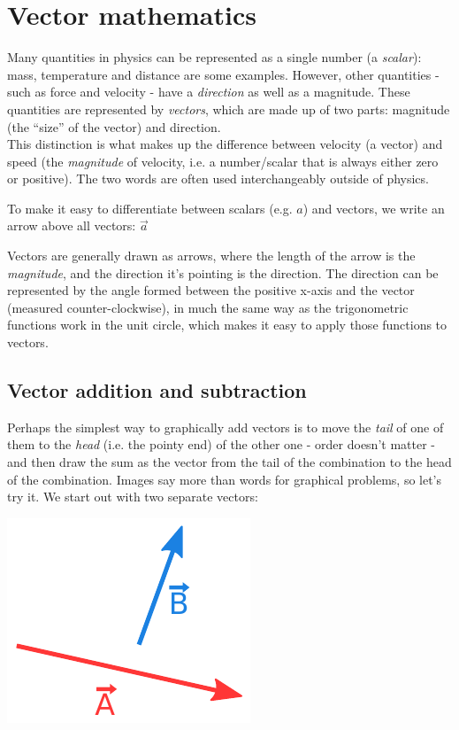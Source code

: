 \documentclass[12pt,a4paper]{report}
\begin{document}
\chapter{Vector mathematics}

Many quantities in physics can be represented as a single number (a \emph{scalar}): mass, temperature and distance are some examples. However, other quantities - such as force and velocity - have a \emph{direction} as well as a magnitude. These quantities are represented by \emph{vectors}, which are made up of two parts: magnitude (the ``size'' of the vector) and direction.\\
This distinction is what makes up the difference between velocity (a vector) and speed (the \emph{magnitude} of velocity, i.e. a number/scalar that is always either zero or positive). The two words are often used interchangeably outside of physics.

To make it easy to differentiate between scalars (e.g. $a$) and vectors, we write an arrow above all vectors: $\displaystyle \vec{a}$

Vectors are generally drawn as arrows, where the length of the arrow is the \emph{magnitude}, and the direction it's pointing is the direction. The direction can be represented by the angle formed between the positive x-axis and the vector (measured counter-clockwise), in much the same way as the trigonometric functions work in the unit circle, which makes it easy to apply those functions to vectors.

\section{Vector addition and subtraction}

Perhaps the simplest way to graphically add vectors is to move the \emph{tail} of one of them to the \emph{head} (i.e. the pointy end) of the other one - order doesn't matter - and then draw the sum as the vector from the tail of the combination to the head of the combination. Images say more than words for graphical problems, so let's try it. We start out with two separate vectors:

\includegraphics[scale=0.8]{Graphics/vectors/adding1}
\end{document}
